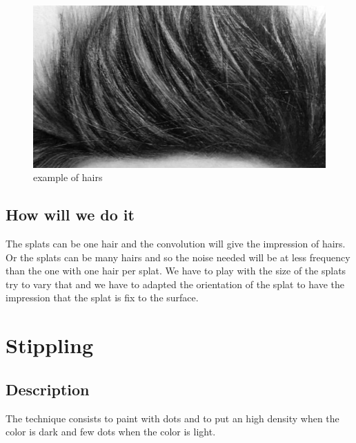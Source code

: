 \documentclass[12pt]{article}
\begin{document}
\begin{figure}[!ht]
    \begin{center}
        \includegraphics[scale=0.3]{image/hairs.jpg}
        \caption{example of hairs}
    \end{center}
\end{figure}

\subsection{How will we do it}

The splats can be one hair and the convolution will give the impression of hairs. Or the splats can be many hairs and so the noise needed will be at less frequency than the one with one hair per splat. We have to play with the size of the splats try to vary that and we have to adapted the orientation of the splat to have the impression that the splat is fix to the surface.

\section{Stippling}

\subsection*{Description}

The technique consists to paint with dots and to put an high density when the color is dark and few dots when the color is light.
\end{document}
